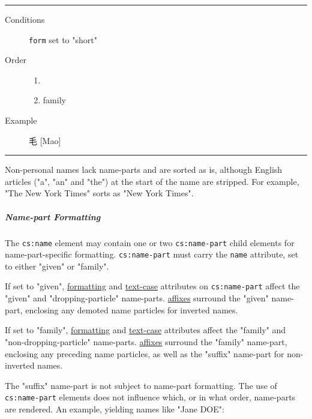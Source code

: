 \begin{center}\rule{0.5\linewidth}{0.5pt}\end{center}

\begin{description}
\item[Conditions]
\texttt{form} set to "short"
\item[Order]
\begin{enumerate}
\def\labelenumi{\arabic{enumi})}
\tightlist
\item[]
\item
  family
\end{enumerate}
\item[Example]
毛 {[}Mao{]}
\end{description}

\begin{center}\rule{0.5\linewidth}{0.5pt}\end{center}

Non-personal names lack name-parts and are sorted as is, although
English articles ("a", "an" and "the") at the start of the name are
stripped. For example, "The New York Times" sorts as "New York Times".

\hypertarget{name-part-formatting}{%
\subparagraph{Name-part Formatting}\label{name-part-formatting}}

The \texttt{cs:name} element may contain one or two
\texttt{cs:name-part} child elements for name-part-specific formatting.
\texttt{cs:name-part} must carry the \texttt{name} attribute, set to
either "given" or "family".

If set to "given", \protect\hyperlink{formatting}{formatting} and
\protect\hyperlink{text-case}{text-case} attributes on
\texttt{cs:name-part} affect the "given" and "dropping-particle"
name-parts. \protect\hyperlink{affixes}{affixes} surround the "given"
name-part, enclosing any demoted name particles for inverted names.

If set to "family", \protect\hyperlink{formatting}{formatting} and
\protect\hyperlink{text-case}{text-case} attributes affect the "family"
and "non-dropping-particle" name-parts.
\protect\hyperlink{affixes}{affixes} surround the "family" name-part,
enclosing any preceding name particles, as well as the "suffix"
name-part for non-inverted names.

The "suffix" name-part is not subject to name-part formatting. The use
of \texttt{cs:name-part} elements does not influence which, or in what
order, name-parts are rendered. An example, yielding names like "Jane
DOE":

